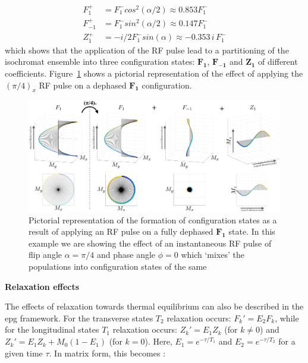 \begin{equation}
\begin{split}
    F_{1}^+  &= F_{1}^- cos^2(\alpha/2) \approx 0.853 F_{1}^- \\
    F_{-1}^+ &= F_{1}^- sin^2(\alpha/2) \approx 0.147 F_{1}^-   \\
    Z_{1}^+  &= - i/2 F_{1}^- sin(\alpha)  \approx - 0.353 \, i \, F_{1}^-
\end{split}
\end{equation}
which shows that the application of the RF pulse lead to a partitioning of the isochromat ensemble into three configuration states: $\bm{F_1}$, $\bm{F_{-1}}$ and $\bm{Z_1}$ of different coefficients.
Figure~\ref{fig:RFPulseinEPG} shows a pictorial representation of the effect of applying the $(\pi/4)_x$ RF pulse on a dephased $\bm{F_1}$ configuration.

\begin{figure}[ht]
    \centering
    \includegraphics[angle=0,width=1\textwidth, keepaspectratio]{images/mrf/RFPulseinEPG}
    \caption{Pictorial representation of the formation of configuration states as a result of applying an RF pulse on a fully dephased $\bm{F_1}$ state.
    In this example we are showing the effect of an instantaneous RF pulse of flip angle $\alpha = \pi/4$ and phase angle $\phi = 0$ which `mixes' the populations into configuration states of the same 
    }
    \label{fig:RFPulseinEPG}
\end{figure}

\hfill

\textbf{Relaxation effects} 

The effects of relaxation towards thermal equilibrium can also be described in the \ac{epg} framework.
For the transverse states $T_2$ relaxation occurs: $F_k' = E_2 F_k$, while for the longitudinal states $T_1$ relaxation occurs: $Z_k' = E_1 Z_k$ (for $k \neq 0$)
and $Z_k' = E_1 Z_k + M_0(1 - E_1)$ (for $k = 0$).
Here, $E_1 = e^{-\tau/T_1}$ and $E_2 = e^{-\tau/T_2}$ for a given time $\tau$.
In matrix form, this becomes \cite{Hennig1991}:

